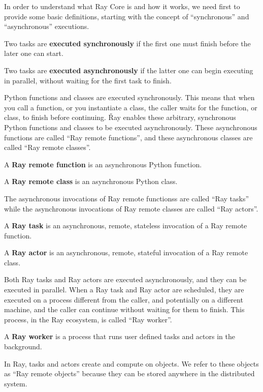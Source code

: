 In order to understand what Ray Core is and how it works, we need first to provide some basic definitions, starting
with the concept of ``synchronous'' and ``asynchronous'' executions.

Two tasks are \textbf{executed synchronously} if the first one must finish before the later one can start.
\ed

Two tasks are \textbf{executed asynchronously} if the latter one can begin executing in parallel, without waiting for
the first task to finish.
\ed

Python functions and classes are executed synchronously. This means that when you call a function, or you instantiate
a class, the caller waits for the function, or class, to finish before continuing. \v

Ray enables these arbitrary, synchronous Python functions and classes to be executed asynchronously. These
asynchronous functions are called ``Ray remote functions'', and these asynchronous classes are called ``Ray remote
classes''.

A \textbf{Ray remote function} is an asynchronous Python function.
\ed

A \textbf{Ray remote class} is an asynchronous Python class.
\ed

The asynchronous invocations of Ray remote functionss are called ``Ray tasks'' while the asynchronous invocations of
Ray remote classes are called ``Ray actors''.

A \textbf{Ray task} is an asynchronous, remote, stateless invocation of a Ray remote function.
\ed

A \textbf{Ray actor} is an asynchronous, remote, stateful invocation of a Ray remote class.
\ed

Both Ray tasks and Ray actors are executed asynchronously, and they can be executed in parallel. When a Ray task and
Ray actor are scheduled, they are executed on a process different from the caller, and potentially on a different
machine, and the caller can continue without waiting for them to finish. This process, in the Ray ecosystem, is
called ``Ray worker''.

A \textbf{Ray worker} is a process that runs user defined tasks and actors in the background.
\ed

In Ray, tasks and actors create and compute on objects. We refer to these objects as ``Ray remote objects'' because
they can be stored anywhere in the distributed system.

